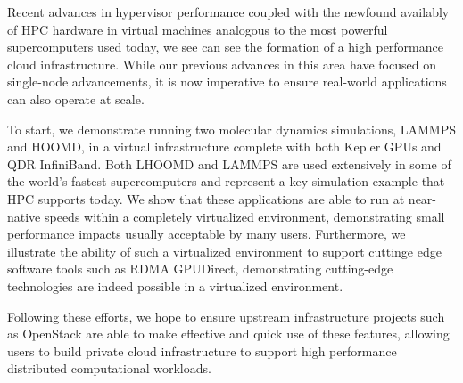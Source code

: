 \documentclass[times,10pt,twocolumn,conference]{IEEEtran}
\begin{document}
Recent advances in hypervisor performance  \cite{Younge2011cloud} coupled with the newfound availably of HPC hardware in virtual machines analogous to the most powerful supercomputers used today, we see can see the formation of a high performance cloud infrastructure. While our previous advances in this area have focused on single-node advancements, it is now imperative to ensure real-world applications can also operate at scale. 

To start, we demonstrate running two molecular dynamics simulations, LAMMPS and HOOMD, in a virtual infrastructure complete with both Kepler GPUs and QDR InfiniBand.  Both LHOOMD and LAMMPS are used extensively in some of the world's fastest supercomputers and represent a key simulation example that HPC supports today.  We show that these applications are able to run at near-native speeds within a completely virtualized environment, demonstrating small performance impacts usually acceptable by many users. Furthermore, we illustrate the ability of such a virtualized environment to support cuttinge edge software tools such as RDMA GPUDirect, demonstrating cutting-edge technologies are indeed possible in a virtualized environment. 

Following these efforts, we hope to ensure upstream infrastructure projects such as OpenStack \cite{www-openstack} are able to make effective and quick use of these features, allowing users to build private cloud infrastructure to support high performance distributed computational workloads. 





 

\end{document}
